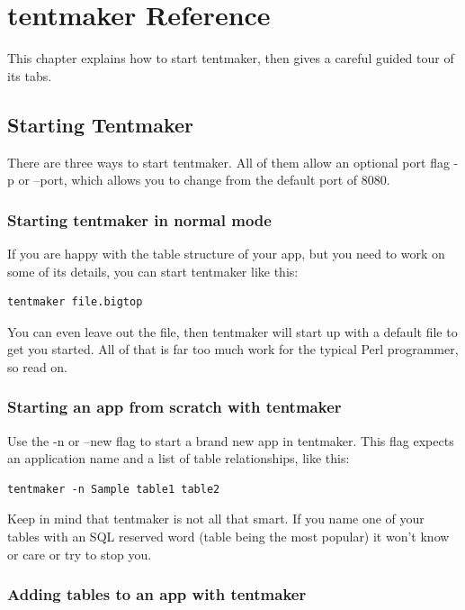 \chapter{tentmaker Reference}
\label{chap:tentref}

This chapter explains how to start tentmaker, then gives a careful guided
tour of its tabs.

\section{Starting Tentmaker}

There are three ways to start tentmaker.  All of them allow an optional
port flag -p or --port, which allows you to change from the default port
of 8080.

\subsection*{Starting tentmaker in normal mode}

If you are happy with the table structure of your app, but you need to
work on some of its details, you can start tentmaker like this:

\begin{verbatim}
tentmaker file.bigtop
\end{verbatim}

You can even leave out the file, then tentmaker will start up with a default
file to get you started.  All of that is far too much work for the typical
Perl programmer, so read on.

\subsection*{Starting an app from scratch with tentmaker}

Use the -n or --new flag to start a brand new app in tentmaker.  This flag
expects an application name and a list of table relationships, like this:

\begin{verbatim}
tentmaker -n Sample table1 table2
\end{verbatim}

Keep in mind that tentmaker is not all that smart.  If you name one of
your tables with an SQL reserved word (table being the most popular) it won't
know or care or try to stop you.

\subsection*{Adding tables to an app with tentmaker}

